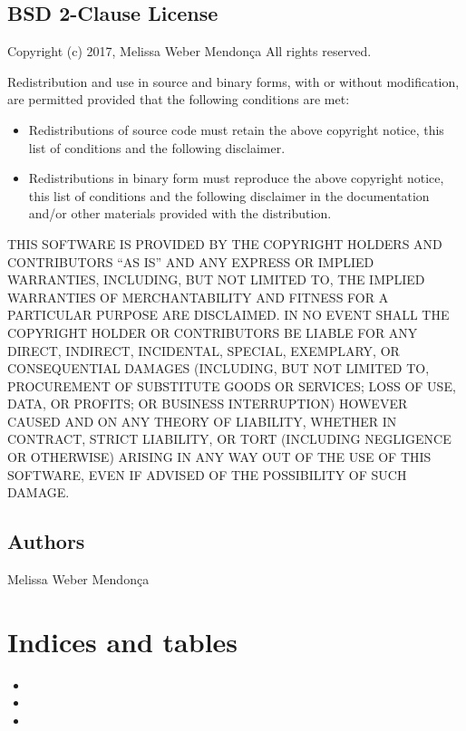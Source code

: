 \documentclass[a4paper,10pt,english]{sphinxmanual}
\begin{document}
\section{BSD 2-Clause License}
\label{\detokenize{license:bsd-2-clause-license}}\label{\detokenize{license::doc}}
Copyright (c) 2017, Melissa Weber Mendonça
All rights reserved.

Redistribution and use in source and binary forms, with or without
modification, are permitted provided that the following conditions are met:
\begin{itemize}
\item {} 
Redistributions of source code must retain the above copyright notice, this
list of conditions and the following disclaimer.

\item {} 
Redistributions in binary form must reproduce the above copyright notice,
this list of conditions and the following disclaimer in the documentation
and/or other materials provided with the distribution.

\end{itemize}

THIS SOFTWARE IS PROVIDED BY THE COPYRIGHT HOLDERS AND CONTRIBUTORS “AS IS”
AND ANY EXPRESS OR IMPLIED WARRANTIES, INCLUDING, BUT NOT LIMITED TO, THE
IMPLIED WARRANTIES OF MERCHANTABILITY AND FITNESS FOR A PARTICULAR PURPOSE ARE
DISCLAIMED. IN NO EVENT SHALL THE COPYRIGHT HOLDER OR CONTRIBUTORS BE LIABLE
FOR ANY DIRECT, INDIRECT, INCIDENTAL, SPECIAL, EXEMPLARY, OR CONSEQUENTIAL
DAMAGES (INCLUDING, BUT NOT LIMITED TO, PROCUREMENT OF SUBSTITUTE GOODS OR
SERVICES; LOSS OF USE, DATA, OR PROFITS; OR BUSINESS INTERRUPTION) HOWEVER
CAUSED AND ON ANY THEORY OF LIABILITY, WHETHER IN CONTRACT, STRICT LIABILITY,
OR TORT (INCLUDING NEGLIGENCE OR OTHERWISE) ARISING IN ANY WAY OUT OF THE USE
OF THIS SOFTWARE, EVEN IF ADVISED OF THE POSSIBILITY OF SUCH DAMAGE.


\section{Authors}
\label{\detokenize{authors::doc}}\label{\detokenize{authors:authors}}
Melissa Weber Mendonça





\chapter{Indices and tables}
\label{\detokenize{index:indices-and-tables}}\begin{itemize}
\item {} 

\item {} 

\item {} 

\end{itemize}
\end{document}
